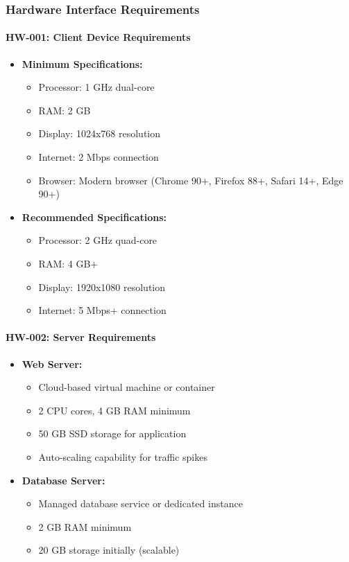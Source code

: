 \documentclass[12pt,a4paper]{article}
\begin{document}
\begin{enumerate}
\subsubsection{Hardware Interface Requirements}

\paragraph{HW-001: Client Device Requirements}
\begin{itemize}
    \item \textbf{Minimum Specifications:}
    \begin{itemize}
        \item Processor: 1 GHz dual-core
        \item RAM: 2 GB
        \item Display: 1024x768 resolution
        \item Internet: 2 Mbps connection
        \item Browser: Modern browser (Chrome 90+, Firefox 88+, Safari 14+, Edge 90+)
    \end{itemize}
    \item \textbf{Recommended Specifications:}
    \begin{itemize}
        \item Processor: 2 GHz quad-core
        \item RAM: 4 GB+
        \item Display: 1920x1080 resolution
        \item Internet: 5 Mbps+ connection
    \end{itemize}
\end{itemize}

\paragraph{HW-002: Server Requirements}
\begin{itemize}
    \item \textbf{Web Server:}
    \begin{itemize}
        \item Cloud-based virtual machine or container
        \item 2 CPU cores, 4 GB RAM minimum
        \item 50 GB SSD storage for application
        \item Auto-scaling capability for traffic spikes
    \end{itemize}
    \item \textbf{Database Server:}
    \begin{itemize}
        \item Managed database service or dedicated instance
        \item 2 GB RAM minimum
        \item 20 GB storage initially (scalable)
    \end{itemize}
\end{itemize}
\newpage 

\end{enumerate}
\end{document}
